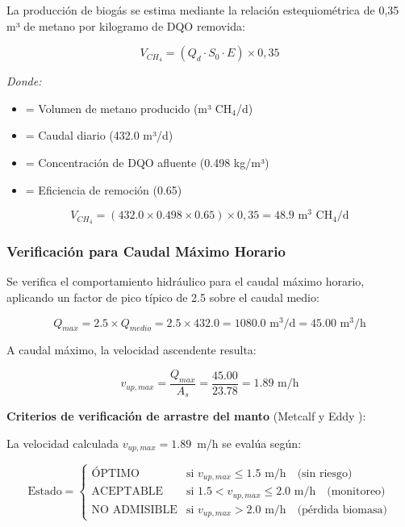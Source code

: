 \documentclass[12pt,a4paper]{article}
\begin{document}
La producción de biogás se estima mediante la relación estequiométrica de 0,35 m³ de metano por kilogramo de DQO removida:

\begin{equation}
V_{CH_4} = (Q_d \cdot S_0 \cdot E) \times 0,35
\end{equation}

\textit{Donde:}
\begin{itemize}[noitemsep,leftmargin=2em]
    \item[$V_{CH_4}$] = Volumen de metano producido (m³ CH$_4$/d)
    \item[$Q_d$] = Caudal diario (432.0 m³/d)
    \item[$S_0$] = Concentración de DQO afluente (0.498 kg/m³)
    \item[$E$] = Eficiencia de remoción (0.65)
\end{itemize}

\begin{equation}
V_{CH_4} = (432.0 \times 0.498 \times 0.65) \times 0,35 = 48.9 \text{ m}^3 \text{ CH}_4\text{/d}
\end{equation}

\subsubsection{Verificación para Caudal Máximo Horario}

Se verifica el comportamiento hidráulico para el caudal máximo horario, aplicando un factor de pico típico de 2.5 sobre el caudal medio:

\begin{equation}
Q_{max} = 2.5 \times Q_{medio} = 2.5 \times 432.0 = 1080.0 \text{ m}^3\text{/d} = 45.00 \text{ m}^3\text{/h}
\end{equation}

A caudal máximo, la velocidad ascendente resulta:

\begin{equation}
v_{up,max} = \frac{Q_{max}}{A_s} = \frac{45.00}{23.78} = 1.89 \text{ m/h}
\end{equation}

\textbf{Criterios de verificación de arrastre del manto} (Metcalf y Eddy \cite{metcalf2014}):

La velocidad calculada $v_{up,max} = 1.89$~m/h se evalúa según:

\begin{equation}
\text{Estado} = \begin{cases}
    \text{ÓPTIMO} & \text{si } v_{up,max} \leq 1.5 \text{ m/h} \quad \text{(sin riesgo)} \\
    \text{ACEPTABLE} & \text{si } 1.5 < v_{up,max} \leq 2.0 \text{ m/h} \quad \text{(monitoreo)} \\
    \text{NO ADMISIBLE} & \text{si } v_{up,max} > 2.0 \text{ m/h} \quad \text{(pérdida biomasa)}
\end{cases}
\end{equation}
\end{document}
